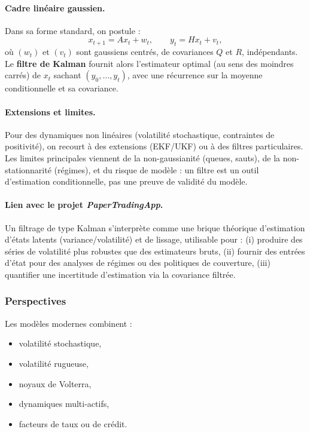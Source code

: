 \documentclass[11pt,a4paper]{article}
\newcommand{\1}{\mathbf{1}}
\begin{document}
\paragraph{Cadre lin\'eaire gaussien.}
Dans sa forme standard, on postule :
\[
x_{t+1} = A x_t + w_t,
\qquad
y_t = H x_t + v_t,
\]
o\`u $(w_t)$ et $(v_t)$ sont gaussiens centr\'es, de covariances $Q$ et $R$, ind\'ependants. Le \textbf{filtre de Kalman}
fournit alors l'estimateur optimal (au sens des moindres carr\'es) de $x_t$ sachant $(y_0,\dots,y_t)$, avec une r\'ecurrence
sur la moyenne conditionnelle et sa covariance.

\paragraph{Extensions et limites.}
Pour des dynamiques non lin\'eaires (volatilité stochastique, contraintes de positivité), on recourt \`a des extensions
(EKF/UKF) ou \`a des filtres particulaires. Les limites principales viennent de la non-gaussianit\'e (queues, sauts),
de la non-stationnarit\'e (r\'egimes), et du risque de mod\`ele : un filtre est un outil d'estimation conditionnelle,
pas une preuve de validit\'e du mod\`ele.

\paragraph{Lien avec le projet \emph{PaperTradingApp}.}
Un filtrage de type Kalman s'interpr\`ete comme une brique th\'eorique d'estimation d'\'etats latents (variance/volatilité)
et de lissage, utilisable pour : (i) produire des s\'eries de volatilité plus robustes que des estimateurs bruts,
(ii) fournir des entr\'ees d'\'etat pour des analyses de r\'egimes ou des politiques de couverture, (iii) quantifier
une incertitude d'estimation via la covariance filtr\'ee.

\subsubsection{Perspectives}

Les mod\`eles modernes combinent :
\begin{itemize}
  \item volatilité stochastique,
  \item volatilité rugueuse,
  \item noyaux de Volterra,
  \item dynamiques multi-actifs,
  \item facteurs de taux ou de crédit.
\end{itemize}
\end{document}
